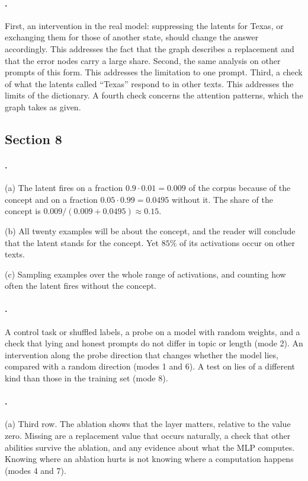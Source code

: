 {\paragraph{.}
First, an intervention in the real model: suppressing the latents for Texas, or exchanging them for those of
another state, should change the answer accordingly. This addresses the fact that the graph describes a
replacement and that the error nodes carry a large share. Second, the same analysis on other prompts of this form.
This addresses the limitation to one prompt. Third, a check of what the latents called ``Texas'' respond to in
other texts. This addresses the limits of the dictionary. A fourth check concerns the attention patterns, which
the graph takes as given.

\subsection*{Section 8}

\paragraph{.}
(a) The latent fires on a fraction $0.9\cdot0.01=0.009$ of the corpus because of the concept and on a fraction
$0.05\cdot0.99=0.0495$ without it. The share of the concept is $0.009/(0.009+0.0495)\approx0.15$.

(b) All twenty examples will be about the concept, and the reader will conclude that the latent stands for the
concept. Yet $85\%$ of its activations occur on other texts.

(c) Sampling examples over the whole range of activations, and counting how often the latent fires without the
concept.

\paragraph{.}
A control task or shuffled labels, a probe on a model with random weights, and a check that lying and honest
prompts do not differ in topic or length (mode 2). An intervention along the probe direction that changes whether
the model lies, compared with a random direction (modes 1 and 6). A test on lies of a different kind than those
in the training set (mode 8).

\paragraph{.}
(a) Third row. The ablation shows that the layer matters, relative to the value zero. Missing are a replacement
value that occurs naturally, a check that other abilities survive the ablation, and any evidence about what the
MLP computes. Knowing where an ablation hurts is not knowing where a computation happens (modes 4 and 7).

}
